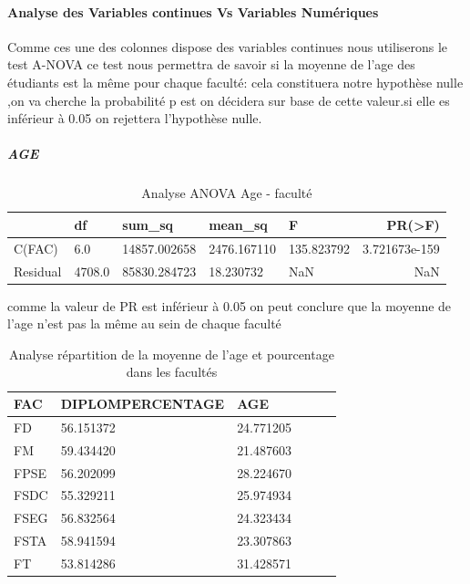  \paragraph{Analyse des Variables continues Vs Variables Numériques}
 Comme ces une des colonnes dispose des variables continues nous 
 utiliserons le test A-NOVA
 ce test nous permettra de savoir si la moyenne de l'age des étudiants
 est la même pour chaque faculté: cela constituera notre hypothèse nulle
 ,on va cherche la probabilité p est on décidera sur base de cette valeur.si elle es inférieur à 0.05 on rejettera l'hypothèse nulle.
\subparagraph{AGE}
 \begin{table}[!htbp]
 	\centering
 	\begingroup %
 	\captionsetup{type=table} %
 	\caption{Analyse ANOVA Age - faculté}
 	\label{tab:ANOVAAge}
 	\begin{tabular}{lllllr}
 		\toprule
 		{} & df     &   sum\_sq &     mean\_sq      &     F    &     PR(>F) \\
 		\midrule
 		C(FAC)    &   6.0 &  14857.002658 & 2476.167110 & 135.823792  &3.721673e-159 \\
 		Residual & 4708.0  &85830.284723    &18.230732    &     NaN    &        NaN \\
 		\bottomrule
 	\end{tabular}
 	\endgroup
 \end{table}
 comme la valeur de PR est inférieur à 0.05 on peut conclure que la
 moyenne de l'age n'est pas la même au sein de chaque faculté
\begin{table}[]
	\centering
	\begingroup %
	\captionsetup{type=table} %
	\caption{Analyse répartition de la moyenne de l'age et pourcentage dans les facultés}
	\label{tab:ANOVAge}
	\begin{tabular}{lllllr}
		\toprule
		FAC & DIPLOMPERCENTAGE &       AGE \\
		\midrule
		FD          &      56.151372  &24.771205 \\
		FM            &   59.434420 & 21.487603\\
		FPSE         &     56.202099  &28.224670\\
		FSDC      &        55.329211 & 25.974934\\
		FSEG        &   56.832564 & 24.323434\\
		FSTA       &      58.941594 & 23.307863\\
		FT       &         53.814286 & 31.428571\\
		\bottomrule
	\end{tabular}
	\endgroup
\end{table}
